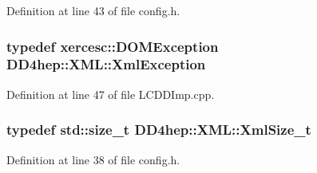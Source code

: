 Definition at line 43 of file config.h.\hypertarget{namespace_d_d4hep_1_1_x_m_l_a60be75f70ac155f3f1a92aa1c69f085b}{
\subsubsection[{XmlException}]{\setlength{\rightskip}{0pt plus 5cm}typedef xercesc::DOMException {\bf DD4hep::XML::XmlException}}}
\label{namespace_d_d4hep_1_1_x_m_l_a60be75f70ac155f3f1a92aa1c69f085b}


Definition at line 47 of file LCDDImp.cpp.\hypertarget{namespace_d_d4hep_1_1_x_m_l_a0509adb4703e562548dcd1df5301f38d}{
\subsubsection[{XmlSize\_\-t}]{\setlength{\rightskip}{0pt plus 5cm}typedef std::size\_\-t {\bf DD4hep::XML::XmlSize\_\-t}}}
\label{namespace_d_d4hep_1_1_x_m_l_a0509adb4703e562548dcd1df5301f38d}


Definition at line 38 of file config.h.

